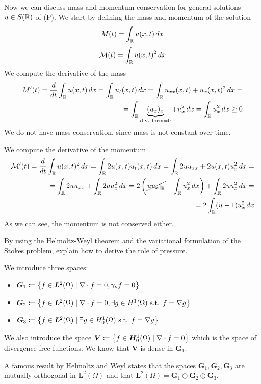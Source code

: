 Now we can discuss mass and momentum conservation for general solutions \(u \in S(\mathbb{R})\) of (P). We start by defining the mass and momentum of the solution
\[
    M(t) = \int_{\mathbb{R}} u(x,t) \, dx
\]
\[
    \mathcal{M}(t) = \int_{\mathbb{R}} u(x,t)^2 \, dx
\]
We compute the derivative of the mass
\[
    \begin{split}
        M'(t) = \frac{d}{dt} \int_{\mathbb{R}} u(x,t) \, dx = \int_{\mathbb{R}} u_t(x,t) \, dx = \int_{\mathbb{R}} u_{xx}(x,t) + u_x(x,t)^2 \, dx =\\
        = \int_{\mathbb{R}} \underbrace{(u_x)_x}_{\text{div. form} = 0} + u_x^2 \, dx = \int_{\mathbb{R}} u_x^2 \, dx \geq 0
    \end{split}
\]
We do not have mass conservation, since mass is not constant over time. 

We compute the derivative of the momentum
\[
    \begin{split}
        \mathcal{M}'(t) = \frac{d}{dt} \int_{\mathbb{R}} u(x,t)^2 \, dx = \int_{\mathbb{R}} 2 u(x,t) u_t(x,t) \, dx = \int_{\mathbb{R}} 2 u u_{xx} + 2 u(x,t) u_x^2 \, dx =  \\
        = \int_{\mathbb{R}} 2 u u_{xx} + \int_{\mathbb{R}} 2 u u_x^2 \, dx = 2\left(\cancel{\left. u u_x \right|_{\mathbb{R}}} - \int_{\mathbb{R}} u_x^2 \, dx\right) + \int_{\mathbb{R}} 2 u u_x^2 \, dx = \\
        = 2 \int_{\mathbb{R}} (u - 1) u_x^2 \, dx
    \end{split}
\]
As we can see, the momentum is not conserved either.

\newpage
\begin{exercise}
    By using the Helmoltz-Weyl theorem and the variational formulation of the Stokes problem, explain how to derive the role of pressure.
\end{exercise}
\begin{remark}
    We introduce three spaces:
    \begin{itemize}
        \item \(\bm{G}_1 \coloneqq \left\{ f \in \bm{L}^2(\Omega) \mid \nabla \cdot f = 0, \gamma_\nu f = 0 \right\}\)
        \item \(\bm{G}_2 \coloneqq \left\{ f \in \bm{L}^2(\Omega) \mid \nabla \cdot f = 0, \exists g \in H^1(\Omega) \text{ s.t. } f = \nabla g \right\}\)
        \item \(\bm{G}_3 \coloneqq \left\{ f \in \bm{L}^2(\Omega) \mid \exists g \in H^1_0(\Omega) \text{ s.t. } f = \nabla g \right\}\)
    \end{itemize}
    We also introduce the space \(\bm{V} \coloneqq \left\{ f \in \bm{H}^1_0(\Omega) \mid \nabla \cdot f = 0 \right\}\) which is the space of divergence-free functions.
    We know that \(\bm{V}\) is dense in \(\bm{G}_1\).

    A famous result by Helmoltz and Weyl states that the spaces \(\bm{G}_1, \bm{G}_2, \bm{G}_3\) are mutually orthogonal in \(\bm{L}^2(\Omega)\) and that \(\bm{L}^2(\Omega) = \bm{G}_1 \oplus \bm{G}_2 \oplus \bm{G}_3\).
\end{remark}

